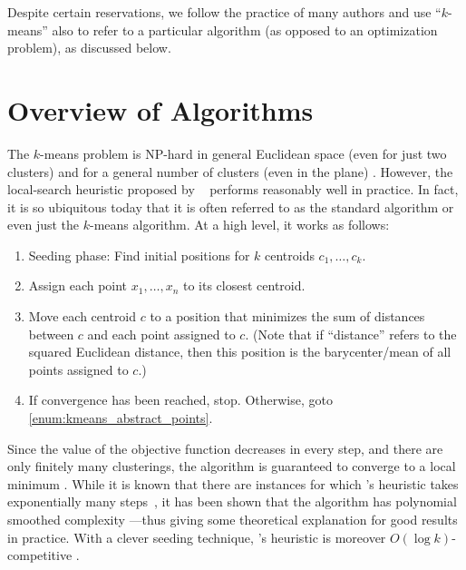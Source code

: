 Despite certain reservations, we follow the practice of many authors and use ``$k$-means'' also to refer to a particular algorithm (as opposed to an optimization problem), as discussed below.

\section{Overview of Algorithms} \label{sec:kmeans:Algorithms}

The $k$-means problem is NP-hard in general Euclidean space (even for just two clusters) \cite{ADH09a} and for a general number of clusters (even in the plane) \cite{MNV10a}. However, the local-search heuristic proposed by \citeauthor{L82a}~\cite{L82a} performs reasonably well in practice. In fact, it is so ubiquitous today that it is often referred to as the standard algorithm or even just the $k$-means algorithm. At a high level, it works as follows:

\begin{enumerate}
	\item Seeding phase: Find initial positions for $k$ centroids $c_1, \dots, c_k$.
	\item Assign each point $x_1, \dots, x_n$ to its closest centroid. \label{enum:kmeans_abstract_points}
	\item Move each centroid $c$ to a position that minimizes the sum of distances between $c$ and each point assigned to $c$. (Note that if ``distance'' refers to the squared Euclidean distance, then this position is the barycenter/mean of all points assigned to $c$.)
	\item If convergence has been reached, stop. Otherwise, goto \eqref{enum:kmeans_abstract_points}.
\end{enumerate}

Since the value of the objective function decreases in every step, and there are only finitely many clusterings, the algorithm is guaranteed to converge to a local minimum \cite[Section~16.4]{CS08a}. While it is known that there are instances for which \citeauthor{L82a}'s heuristic takes exponentially many steps~\cite{V09a}, it has been shown that the algorithm has polynomial smoothed complexity \cite{AMR09a}---thus giving some theoretical explanation for good results in practice. With a clever seeding technique, \citeauthor{L82a}'s heuristic is moreover $O(\log k)$-competitive \cite{AV07a}.


